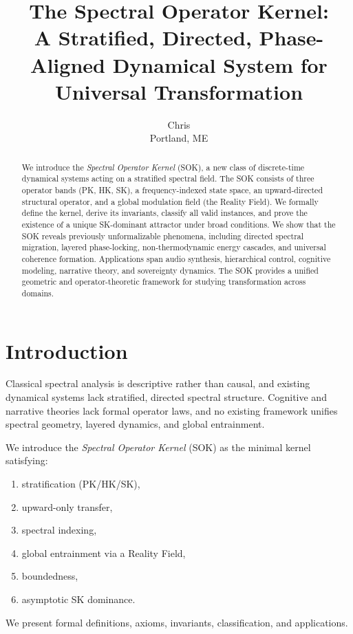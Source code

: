 \documentclass[11pt]{article}
\title{The Spectral Operator Kernel:\\
A Stratified, Directed, Phase-Aligned Dynamical System for Universal Transformation}
\author{Chris \\ \small Portland, ME}
\date{}
\begin{document}
\maketitle

\begin{abstract}
We introduce the \emph{Spectral Operator Kernel} (SOK), a new class of 
discrete-time dynamical systems acting on a stratified spectral field.
The SOK consists of three operator bands (PK, HK, SK), a frequency-indexed 
state space, an upward-directed structural operator, and a global modulation 
field (the Reality Field). We formally define the kernel, derive its invariants, 
classify all valid instances, and prove the existence of a unique SK-dominant 
attractor under broad conditions. We show that the SOK reveals previously 
unformalizable phenomena, including directed spectral migration, layered 
phase-locking, non-thermodynamic energy cascades, and universal coherence 
formation. Applications span audio synthesis, hierarchical control, cognitive 
modeling, narrative theory, and sovereignty dynamics. The SOK provides a unified 
geometric and operator-theoretic framework for studying transformation across domains.
\end{abstract}

\section{Introduction}

Classical spectral analysis is descriptive rather than causal, and existing 
dynamical systems lack stratified, directed spectral structure. Cognitive and 
narrative theories lack formal operator laws, and no existing framework unifies 
spectral geometry, layered dynamics, and global entrainment.

We introduce the \emph{Spectral Operator Kernel} (SOK) as the minimal kernel 
satisfying:
\begin{enumerate}[label=(\roman*)]
    \item stratification (PK/HK/SK),
    \item upward-only transfer,
    \item spectral indexing,
    \item global entrainment via a Reality Field,
    \item boundedness,
    \item asymptotic SK dominance.
\end{enumerate}

We present formal definitions, axioms, invariants, classification, and 
applications.
\end{document}
